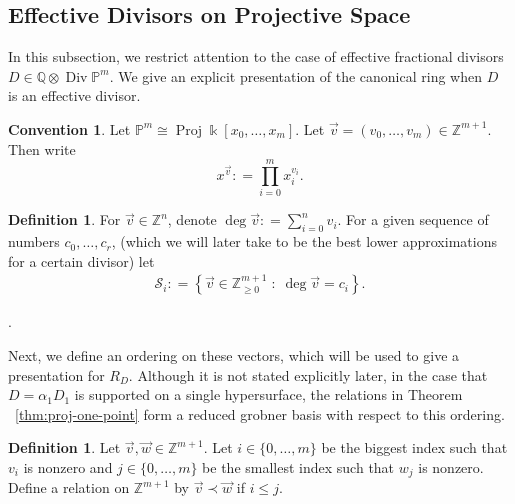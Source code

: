 \documentclass{amsart}
\theoremstyle{plain}
\theoremstyle{definition}
\newtheorem{defn}[thm]{Definition}
\newtheorem{convention}[thm]{Convention}
\theoremstyle{remark}
\numberwithin{equation}{section}
\newcommand\ssec{\subsection}
\newcommand\bq{{\mathbb Q}}
\newcommand\bp{{\mathbb P}}
\newcommand\bz{{\mathbb Z}}
\newcommand\bk{{\Bbbk}}
\DeclareMathOperator\di{Div}
\newcommand\mss{\mathscr{S}}
\DeclareMathOperator{\proj}{Proj}
\begin{document}
\ssec{Effective Divisors on Projective Space}
\label{ssec:proj-one-point}

In this subsection, we restrict attention to the case of effective
fractional divisors $D \in \bq \otimes \di \bp^m$. We give an explicit presentation of the canonical ring when $D$ is an effective
divisor.

\begin{convention}
Let $\bp^m \cong \proj \bk[x_0, \ldots, x_m]$. Let
$\vec{v} = (v_0, \ldots, v_m) \in \bz^{m + 1}$.  Then write
\[
	x^{\vec{v}} \colon = \prod_{i = 0}^{m} x_i^{v_i}.
\]
\end{convention}

\begin{defn}
\label{defn:vec-sum}
For $\vec{v} \in \bz^n$, denote $\deg \vec{v} \colon = \sum_{i = 0}
^n v_i$.
For a given sequence of numbers $c_0, \ldots, c_r$, (which
we will later take to be the best lower approximations
for a certain divisor) let 
\begin{align*}
	\mss_i \colon = \left \{\vec{v} \in \bz_{\geq 0}^{m + 1} \; : \;
\deg \vec v = c_i \right\}.	
\end{align*}

\noindent
.\end{defn}

Next, we define an ordering on these vectors, which will be used to give a presentation for $R_D$. Although it is not
stated explicitly later, in the case that $D = \alpha_1 D_1$ is supported on a single hypersurface, the relations in
Theorem ~\ref{thm:proj-one-point} form a reduced grobner basis with respect to
this ordering.

\begin{defn}
\label{defn:vec-order}
Let $\vec{v}, \vec{w} \in \bz^{m+1}$. Let $i \in \{0,\ldots, m\}$
be the biggest index such that $v_i$ is nonzero
and $j \in \{0,\ldots, m\}$ be the smallest index such that $w_j$ is
nonzero. Define a relation on $\bz^{m+1}$ by $\vec{v} \prec \vec{w}$ if $i \leq j$.  
\end{defn}
\end{document}
